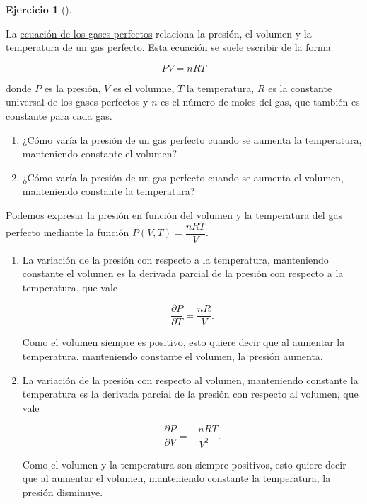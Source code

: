 \documentclass[
  spanish,
  a4paper,
]{scrreport}
\theoremstyle{definition}
\newtheorem{exercise}{Ejercicio}[chapter]
\theoremstyle{remark}
\begin{document}
\begin{exercise}[]\protect\hypertarget{exr-derivada-parcial-gases-perfectos}{}\label{exr-derivada-parcial-gases-perfectos}

La
\href{https://es.wikipedia.org/wiki/Ley_de_los_gases_ideales}{ecuación
de los gases perfectos} relaciona la presión, el volumen y la
temperatura de un gas perfecto. Esta ecuación se suele escribir de la
forma

\[
PV = nRT
\]

donde \(P\) es la presión, \(V\) es el volumne, \(T\) la temperatura,
\(R\) es la constante universal de los gases perfectos y \(n\) es el
número de moles del gas, que también es constante para cada gas.

\begin{enumerate}
\def\labelenumi{\alph{enumi}.}
\item
  ¿Cómo varía la presión de un gas perfecto cuando se aumenta la
  temperatura, manteniendo constante el volumen?
\item
  ¿Cómo varía la presión de un gas perfecto cuando se aumenta el
  volumen, manteniendo constante la temperatura?
\end{enumerate}

\end{exercise}

\begin{tcolorbox}[enhanced jigsaw, arc=.35mm, bottomrule=.15mm, bottomtitle=1mm, breakable, colback=white, colbacktitle=quarto-callout-tip-color!10!white, colframe=quarto-callout-tip-color-frame, coltitle=black, left=2mm, leftrule=.75mm, opacityback=0, opacitybacktitle=0.6, rightrule=.15mm, title=\textcolor{quarto-callout-tip-color}{\faLightbulb}\hspace{0.5em}{Solución}, titlerule=0mm, toprule=.15mm, toptitle=1mm]

Podemos expresar la presión en función del volumen y la temperatura del
gas perfecto mediante la función \(P(V,T) = \dfrac{nRT}{V}\).

\begin{enumerate}
\def\labelenumi{\alph{enumi}.}
\item
  La variación de la presión con respecto a la temperatura, manteniendo
  constante el volumen es la derivada parcial de la presión con respecto
  a la temperatura, que vale

  \[
  \frac{\partial P}{\partial T} = \frac{nR}{V}.
  \]

  Como el volumen siempre es positivo, esto quiere decir que al aumentar
  la temperatura, manteniendo constante el volumen, la presión aumenta.
\item
  La variación de la presión con respecto al volumen, manteniendo
  constante la temperatura es la derivada parcial de la presión con
  respecto al volumen, que vale

  \[
  \frac{\partial P}{\partial V} = \frac{-nRT}{V^2}.
  \]

  Como el volumen y la temperatura son siempre positivos, esto quiere
  decir que al aumentar el volumen, manteniendo constante la
  temperatura, la presión disminuye.
\end{enumerate}

\end{tcolorbox}
\end{document}
